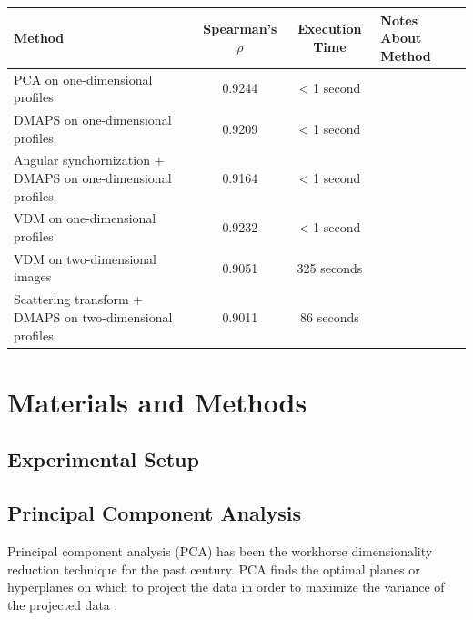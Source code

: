 \documentclass[10pt]{article}
\begin{document}
\begin{table}
	\begin{tabular}{| p{} | c | c | p{} |}
		\hline 
		Method & Spearman's $\rho$ & Execution Time & Notes About Method \\ 
		\hline 
		PCA on one-dimensional profiles & 0.9244 & < 1 second & \\
		\hline 
		DMAPS on one-dimensional profiles & 0.9209 & < 1 second & \\
		\hline 
		Angular synchornization + DMAPS on one-dimensional profiles & 0.9164 & < 1 second & \\
		\hline 
		VDM on one-dimensional profiles & 0.9232 & < 1 second & \\	
		\hline 
		VDM on two-dimensional images & 0.9051  & 325 seconds & \\
		\hline 	
		Scattering transform + DMAPS on two-dimensional profiles & 0.9011  & 86 seconds & \\
		\hline
	\end{tabular}
\end{table}
\section*{Materials and Methods}

\subsection*{Experimental Setup}

\subsection*{Principal Component Analysis}
Principal component analysis (PCA) has been the workhorse dimensionality reduction technique for the past century.
%
PCA finds the optimal planes or hyperplanes on which to project the data in order to maximize the variance of the projected data \cite{shlens2005tutorial}.
\end{document}
